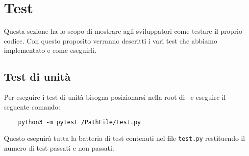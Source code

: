 \section{Test}

Questa sezione ha lo scopo di mostrare agli sviluppatori come testare il proprio codice. Con questo proposito verranno descritti i vari test che abbiamo
implementato e come eseguirli.

\subsection{Test di unità}

Per eseguire i test di unità bisogna posizionarsi nella root di \progetto\ e eseguire il seguente comando: \\ 

\begin{lstlisting}
    python3 -m pytest /PathFile/test.py
\end{lstlisting}

Questo eseguirà tutta la batteria di test contenuti nel file \texttt{test.py} restituendo il numero di test passati e non passati.
